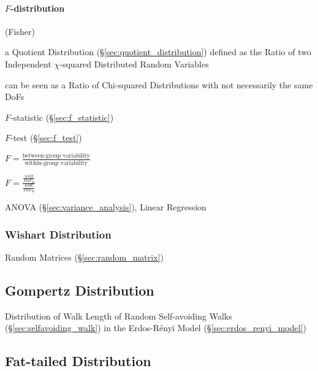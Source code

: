 \paragraph{$F$-distribution}\label{sec:f_distribution}\hfill

(Fisher)

a Quotient Distribution (\S\ref{sec:quotient_distribution}) defined as the Ratio
of two Independent $\chi$-squared Distributed Random Variables

can be seen as a Ratio of Chi-squared Distributions with not necessarily the
same DoFs

$F$-statistic (\S\ref{sec:f_statistic})

$F$-test (\S\ref{sec:f_test})

$F = \frac{\text{between-group variability}}{\text{within-group variability}}$

$F = \frac{\frac{SSB}{DoF_B}}{\frac{SSW}{DoF_W}}$

ANOVA (\S\ref{sec:variance_analysis}), Linear Regression



\subsubsection{Wishart Distribution}\label{sec:wishart_distribution}

Random Matrices (\S\ref{sec:random_matrix})



\subsection{Gompertz Distribution}\label{sec:gompertz_distribution}

Distribution of Walk Length of Random Self-avoiding Walks
(\S\ref{sec:selfavoiding_walk}) in the Erdos-R\'enyi Model
(\S\ref{sec:erdos_renyi_model})



\subsection{Fat-tailed Distribution}\label{sec:fat_tailed}

